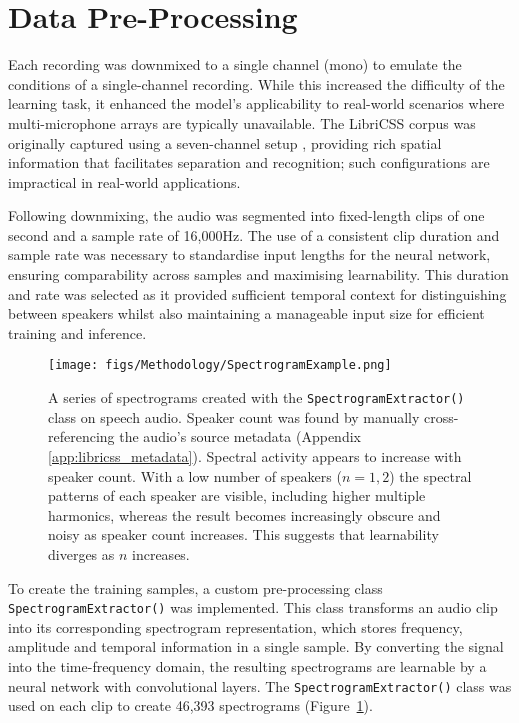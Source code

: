 \section{Data Pre-Processing}
\label{sec:data_preproc}
Each recording was downmixed to a single channel (mono) to emulate the conditions of a single-channel recording. While this increased the difficulty of the learning task, it enhanced the model's applicability to real-world scenarios where multi-microphone arrays are typically unavailable. The LibriCSS corpus was originally captured using a seven-channel setup \cite{libricss}, providing rich spatial information that facilitates separation and recognition; such configurations are impractical in real-world applications.\newline

\noindent Following downmixing, the audio was segmented into fixed-length clips of one second and a sample rate of 16,000Hz. The use of a consistent clip duration and sample rate was necessary to standardise input lengths for the neural network, ensuring comparability across samples and maximising learnability. This duration and rate was selected as it provided sufficient temporal context for distinguishing between speakers whilst also maintaining a manageable input size for efficient training and inference.

\begin{figure}[H]
  \centering
  \texttt{[image: figs/Methodology/SpectrogramExample.png]}
  \caption{A series of spectrograms created with the \lstinline!SpectrogramExtractor()! class on speech audio. Speaker count was found by manually cross-referencing the audio's source metadata (Appendix \ref{app:libricss_metadata}). Spectral activity appears to increase with speaker count. With a low number of speakers ($n = 1, 2$) the spectral patterns of each speaker are visible, including higher multiple harmonics, whereas the result becomes increasingly obscure and noisy as speaker count increases. This suggests that learnability diverges as $n$ increases.}
  \label{fig:spec_samples}
\end{figure}

To create the training samples, a custom pre-processing class \lstinline!SpectrogramExtractor()! was implemented. This class transforms an audio clip into its corresponding spectrogram representation, which stores frequency, amplitude and temporal information in a single sample. By converting the signal into the time-frequency domain, the resulting spectrograms are learnable by a neural network with convolutional layers. The \lstinline!SpectrogramExtractor()! class was used on each clip to create 46,393 spectrograms (Figure~\ref{fig:spec_samples}).\newline

